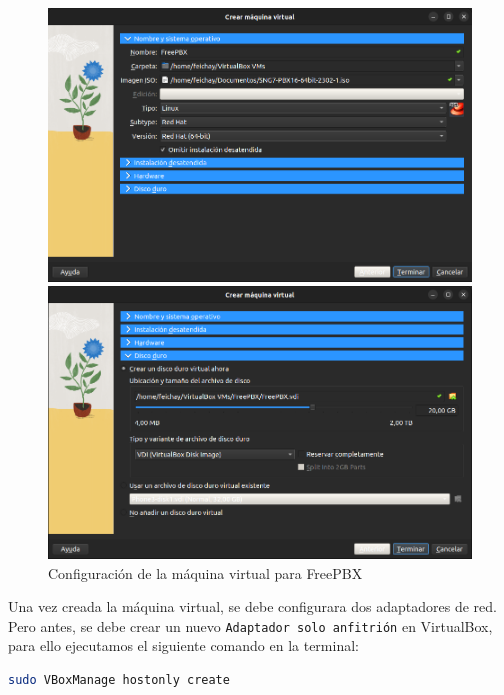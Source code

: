 \begin{figure}[H]
    \centering
    \begin{minipage}{0.49\textwidth}
        \centering
        \includegraphics[width=\textwidth]{images/freepbx_virtualbox.png}
    \end{minipage}\hfill
    \begin{minipage}{0.49\textwidth}
        \centering
        \includegraphics[width=\textwidth]{images/freepbx_virtualbox_2.png}
    \end{minipage}
		\caption{Configuración de la máquina virtual para FreePBX}
		\label{fig:freepbx_virtualbox}
\end{figure}

Una vez creada la máquina virtual, se debe configurara dos adaptadores de red. Pero antes, se debe crear un nuevo \texttt{Adaptador solo anfitrión} en VirtualBox, 
para ello ejecutamos el siguiente comando en la terminal:
\begin{lstlisting}[language=bash]
sudo VBoxManage hostonly create
\end{lstlisting}

